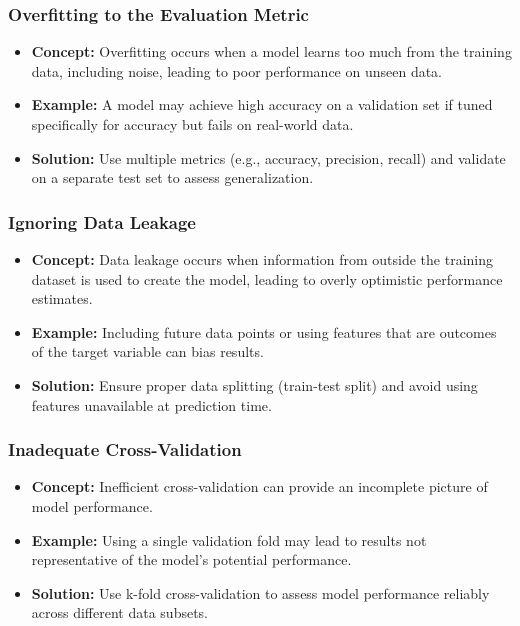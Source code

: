 \documentclass[aspectratio=169]{beamer}
\begin{document}
\begin{frame}[fragile]
  \frametitle{Overfitting to the Evaluation Metric}
  \begin{itemize}
    \item \textbf{Concept:} Overfitting occurs when a model learns too much from the training data, including noise, leading to poor performance on unseen data.
    \item \textbf{Example:} A model may achieve high accuracy on a validation set if tuned specifically for accuracy but fails on real-world data.
    \item \textbf{Solution:} Use multiple metrics (e.g., accuracy, precision, recall) and validate on a separate test set to assess generalization.
  \end{itemize}
\end{frame}

\begin{frame}[fragile]
  \frametitle{Ignoring Data Leakage}
  \begin{itemize}
    \item \textbf{Concept:} Data leakage occurs when information from outside the training dataset is used to create the model, leading to overly optimistic performance estimates.
    \item \textbf{Example:} Including future data points or using features that are outcomes of the target variable can bias results.
    \item \textbf{Solution:} Ensure proper data splitting (train-test split) and avoid using features unavailable at prediction time.
  \end{itemize}
\end{frame}

\begin{frame}[fragile]
  \frametitle{Inadequate Cross-Validation}
  \begin{itemize}
    \item \textbf{Concept:} Inefficient cross-validation can provide an incomplete picture of model performance.
    \item \textbf{Example:} Using a single validation fold may lead to results not representative of the model's potential performance.
    \item \textbf{Solution:} Use k-fold cross-validation to assess model performance reliably across different data subsets.
  \end{itemize}
\end{frame}
\end{document}
